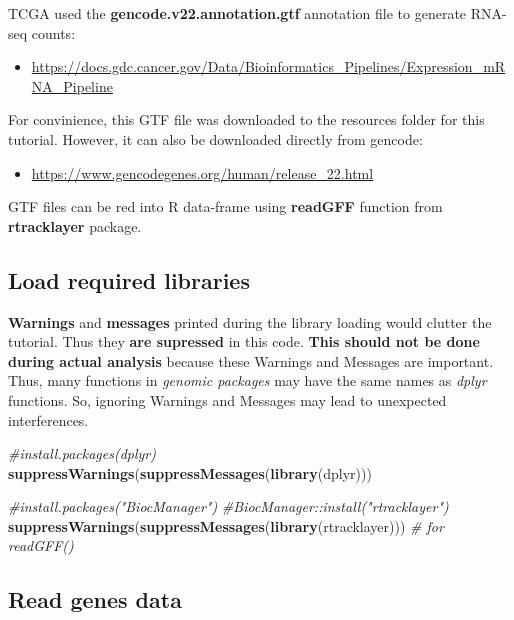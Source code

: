 \documentclass[]{book}
\newenvironment{Shaded}{\begin{snugshade}}{\end{snugshade}}
\newcommand{\KeywordTok}[1]{\textcolor[rgb]{0.13,0.29,0.53}{\textbf{#1}}}
\newcommand{\CommentTok}[1]{\textcolor[rgb]{0.56,0.35,0.01}{\textit{#1}}}
\newcommand{\NormalTok}[1]{#1}
\providecommand{\tightlist}{%
  \setlength{\itemsep}{0pt}\setlength{\parskip}{0pt}}
\begin{document}
TCGA used the \textbf{gencode.v22.annotation.gtf} annotation file to
generate RNA-seq counts:

\begin{itemize}
\tightlist
\item
  \url{https://docs.gdc.cancer.gov/Data/Bioinformatics_Pipelines/Expression_mRNA_Pipeline}
\end{itemize}

For convinience, this GTF file was downloaded to the resources folder
for this tutorial. However, it can also be downloaded directly from
gencode:

\begin{itemize}
\tightlist
\item
  \url{https://www.gencodegenes.org/human/release_22.html}
\end{itemize}

GTF files can be red into R data-frame using \textbf{readGFF} function
from \textbf{rtracklayer} package.

\subsection{Load required libraries}\label{load-required-libraries}

\textbf{Warnings} and \textbf{messages} printed during the library
loading would clutter the tutorial. Thus they \textbf{are supressed} in
this code. \textbf{This should not be done during actual analysis}
because these Warnings and Messages are important. Thus, many functions
in \emph{genomic packages} may have the same names as \emph{dplyr}
functions. So, ignoring Warnings and Messages may lead to unexpected
interferences.

\begin{Shaded}
\begin{Highlighting}[]
\CommentTok{#install.packages(dplyr)}
\KeywordTok{suppressWarnings}\NormalTok{(}\KeywordTok{suppressMessages}\NormalTok{(}\KeywordTok{library}\NormalTok{(dplyr)))}

\CommentTok{#install.packages("BiocManager")}
\CommentTok{#BiocManager::install("rtracklayer")}
\KeywordTok{suppressWarnings}\NormalTok{(}\KeywordTok{suppressMessages}\NormalTok{(}\KeywordTok{library}\NormalTok{(rtracklayer))) }\CommentTok{# for readGFF()}
\end{Highlighting}
\end{Shaded}

\subsection{Read genes data}\label{read-genes-data}
\end{document}
